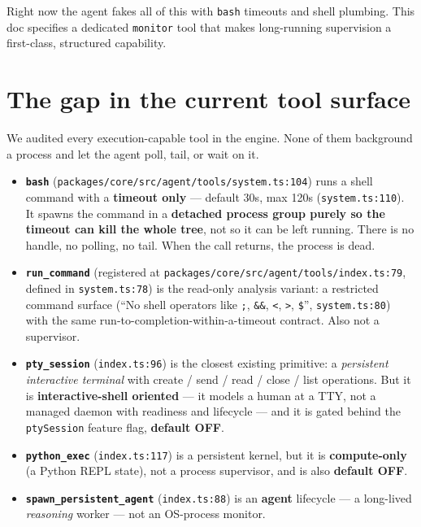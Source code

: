 \documentclass[11pt]{article}
\begin{document}
Right now the agent fakes all of this with \texttt{bash} timeouts and shell
plumbing. This doc specifies a dedicated \texttt{monitor} tool that makes
long-running supervision a first-class, structured capability.

\section{The gap in the current tool surface}

We audited every execution-capable tool in the engine. None of them background a
process and let the agent poll, tail, or wait on it.

\begin{itemize}[leftmargin=*]
  \item \textbf{\texttt{bash}}
  (\texttt{packages/core/src/agent/tools/system.ts:104}) runs a shell command
  with a \textbf{timeout only} --- default 30s, max 120s
  (\texttt{system.ts:110}). It spawns the command in a \textbf{detached process
  group purely so the timeout can kill the whole tree}, not so it can be left
  running. There is no handle, no polling, no tail. When the call returns, the
  process is dead.
  \item \textbf{\texttt{run\_command}} (registered at
  \texttt{packages/core/src/agent/tools/index.ts:79}, defined in
  \texttt{system.ts:78}) is the read-only analysis variant: a restricted command
  surface (``No shell operators like \texttt{;}, \texttt{\&\&}, \texttt{<},
  \texttt{>}, \texttt{\$}'', \texttt{system.ts:80}) with the same
  run-to-completion-within-a-timeout contract. Also not a supervisor.
  \item \textbf{\texttt{pty\_session}} (\texttt{index.ts:96}) is the closest
  existing primitive: a \textit{persistent interactive terminal} with create /
  send / read / close / list operations. But it is \textbf{interactive-shell
  oriented} --- it models a human at a TTY, not a managed daemon with readiness
  and lifecycle --- and it is gated behind the \texttt{ptySession} feature flag,
  \textbf{default OFF}.
  \item \textbf{\texttt{python\_exec}} (\texttt{index.ts:117}) is a persistent
  kernel, but it is \textbf{compute-only} (a Python REPL state), not a process
  supervisor, and is also \textbf{default OFF}.
  \item \textbf{\texttt{spawn\_persistent\_agent}} (\texttt{index.ts:88}) is an
  \textbf{agent} lifecycle --- a long-lived \textit{reasoning} worker --- not an
  OS-process monitor.
\end{itemize}
\end{document}
